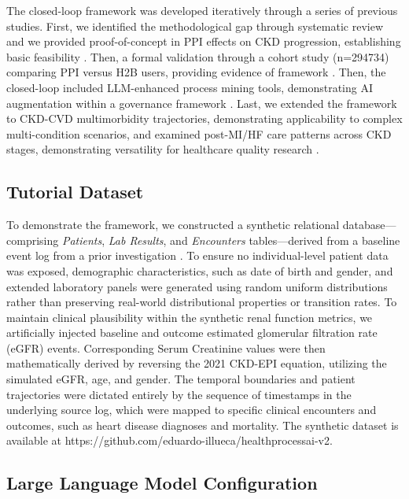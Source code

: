 \documentclass[sn-vancouver-num]{sn-jnl}
\begin{document}
The closed-loop framework was developed iteratively through a series of previous studies. First, we  identified the methodological gap through systematic review \citep{chen2023} and we provided proof-of-concept in PPI effects on CKD progression, establishing basic feasibility \citep{chen2024a}. Then, a formal validation through a cohort study (n=294734) comparing PPI versus H2B users, providing evidence of framework \citep{chen2024b}.  Then, the closed-loop included LLM-enhanced process mining tools, demonstrating AI augmentation within a governance framework \citep{illueca2026}.  Last, we extended the framework to CKD-CVD multimorbidity trajectories, demonstrating applicability to complex multi-condition scenarios, and examined post-MI/HF care patterns across CKD stages, demonstrating versatility for healthcare quality research \citep{chen2025}.


\subsection{Tutorial Dataset}

To demonstrate the framework, we constructed a synthetic relational database—comprising \textit{Patients}, \textit{Lab Results}, and \textit{Encounters} tables—derived from a baseline event log from a prior investigation \citep{chen2025}. To ensure no individual-level patient data was exposed, demographic characteristics, such as date of birth and gender, and extended laboratory panels were generated using random uniform distributions rather than preserving real-world distributional properties or transition rates. To maintain clinical plausibility within the synthetic renal function metrics, we artificially injected baseline and outcome estimated glomerular filtration rate (eGFR) events. Corresponding Serum Creatinine values were then mathematically derived by reversing the 2021 CKD-EPI equation, utilizing the simulated eGFR, age, and gender. The temporal boundaries and patient trajectories were dictated entirely by the sequence of timestamps in the underlying source log, which were mapped to specific clinical encounters and outcomes, such as heart disease diagnoses and mortality. The synthetic dataset is available at https://github.com/eduardo-illueca/healthprocessai-v2.

\subsection{Large Language Model Configuration}
\end{document}
